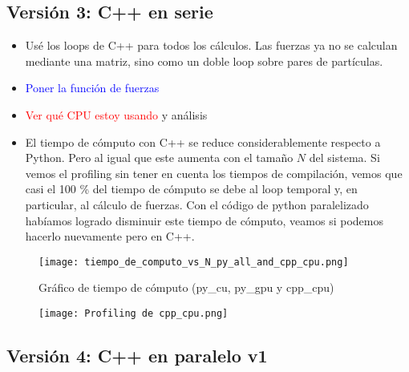 \documentclass[aps,prb,twocolumn,superscriptaddress,floatfix,longbibliography]{revtex4-2}
\newcounter{para}
\begin{document}
\begin{itemize}
\subsection{Versión 3: C++ en serie}

\begin{itemize}
    \item Usé los loops de C++ para todos los cálculos. Las fuerzas ya no se calculan mediante una matriz, sino como un doble loop sobre pares de partículas.
    \item \textcolor{blue}{Poner la función de fuerzas}
    \item \textcolor{red}{Ver qué CPU estoy usando} y análisis
    \item El tiempo de cómputo con C++ se reduce considerablemente respecto a Python. Pero al igual que este aumenta con el tamaño $N$ del sistema. Si vemos el profiling sin tener en cuenta los tiempos de compilación, vemos que casi el 100 \% del tiempo de cómputo se debe al loop temporal y, en particular, al cálculo de fuerzas. Con el código de python paralelizado habíamos logrado disminuir este tiempo de cómputo, veamos si podemos hacerlo nuevamente pero en C++.
\end{itemize}




\begin{figure}[h]
    \texttt{[image: tiempo\_de\_computo\_vs\_N\_py\_all\_and\_cpp\_cpu.png]}
    \caption{Gráfico de tiempo de cómputo (py_cu, py_gpu y cpp_cpu)}
     \label{fig:tiempo_de_computo_vs_N_py_all_and_cpp_cpu}
\end{figure}

\begin{figure}[h]
    \texttt{[image: Profiling de cpp\_cpu.png]}
    \caption{}
     \label{fig:Profiling de cpp_cpu}
\end{figure}


\subsection{Versión 4: C++ en paralelo v1}


\end{itemize}
\end{document}
